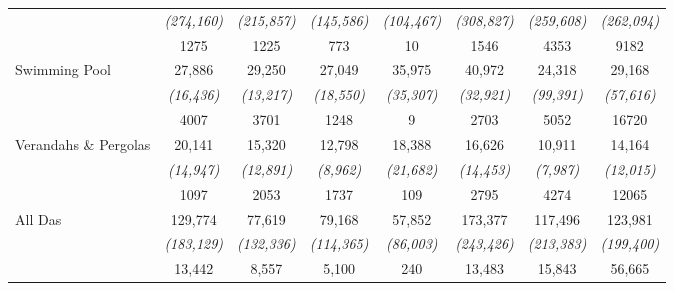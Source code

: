 \begin{table}[!htbp]
{\begin{tabular}{rccccccc}
          & \textit{(274,160)} & \textit{(215,857)} & \textit{(145,586)} & \textit{(104,467)} & \textit{(308,827)} & \textit{(259,608)} & \textit{(262,094)} \\
          & 1275  & 1225  & 773   & 10    & 1546  & 4353  & 9182 \\
    \multicolumn{1}{l}{Swimming Pool} & 27,886 & 29,250 & 27,049 & 35,975 & 40,972 & 24,318 & 29,168 \\
          & \textit{(16,436)} & \textit{(13,217)} & \textit{(18,550)} & \textit{(35,307)} & \textit{(32,921)} & \textit{(99,391)} & \textit{(57,616)} \\
          & 4007  & 3701  & 1248  & 9     & 2703  & 5052  & 16720 \\
    \multicolumn{1}{l}{Verandahs \& Pergolas} & 20,141 & 15,320 & 12,798 & 18,388 & 16,626 & 10,911 & 14,164 \\
          & \textit{(14,947)} & \textit{(12,891)} & \textit{(8,962)} & \textit{(21,682)} & \textit{(14,453)} & \textit{(7,987)} & \textit{(12,015)} \\
          & 1097  & 2053  & 1737  & 109   & 2795  & 4274  & 12065 \\
    \multicolumn{1}{l}{All Das} & 129,774 & 77,619 & 79,168 & 57,852 & 173,377 & 117,496 & 123,981 \\
          & \textit{(183,129)} & \textit{(132,336)} & \textit{(114,365)} & \textit{(86,003)} & \textit{(243,426)} & \textit{(213,383)} & \textit{(199,400)} \\
          & 13,442 & 8,557 & 5,100 & 240   & 13,483 & 15,843 & 56,665 \\
    \bottomrule
    \end{tabular}%
    }
  \label{tab:DA_stats_rs_level_const_dollar}%
\end{table}%
